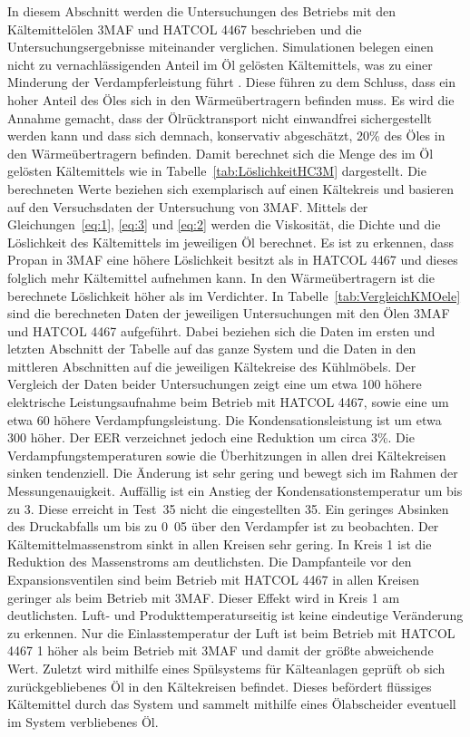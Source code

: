 In diesem Abschnitt werden die Untersuchungen des Betriebs mit den Kältemittelölen 3MAF und HATCOL 4467 beschrieben und die Untersuchungsergebnisse miteinander verglichen.
Simulationen belegen einen nicht zu vernachlässigenden Anteil im Öl gelösten Kältemittels, was zu einer Minderung der Verdampferleistung führt \cite{Universitatpolitecnicadevalencia.2017}. Diese führen zu dem Schluss, dass ein hoher Anteil des Öles sich in den Wärmeübertragern befinden muss. Es wird die Annahme gemacht, dass der Ölrücktransport nicht einwandfrei sichergestellt werden kann und dass sich demnach, konservativ abgeschätzt, \unit{20}{\%} des Öles in den Wärmeübertragern befinden. Damit berechnet sich die Menge des im Öl gelösten Kältemittels wie in Tabelle~\ref{tab:LöslichkeitHC3M} dargestellt.
Die berechneten Werte beziehen sich exemplarisch auf einen Kältekreis und basieren auf den Versuchsdaten der Untersuchung von 3MAF.
Mittels der Gleichungen~\ref{eq:1}, \ref{eq:3} und \ref{eq:2} werden die Viskosität, die Dichte und die Löslichkeit des Kältemittels im jeweiligen Öl berechnet. Es ist zu erkennen, dass Propan in 3MAF eine höhere Löslichkeit besitzt als in HATCOL 4467 und dieses folglich mehr Kältemittel aufnehmen kann. In den Wärmeübertragern ist die berechnete Löslichkeit höher als im Verdichter. \newline
In Tabelle~\ref{tab:VergleichKMOele} sind die berechneten Daten der jeweiligen Untersuchungen mit den Ölen 3MAF und HATCOL 4467 aufgeführt. Dabei beziehen sich die Daten im ersten und letzten Abschnitt der Tabelle auf das ganze System und die Daten in den mittleren Abschnitten auf die jeweiligen Kältekreise des Kühlmöbels.
Der Vergleich der Daten beider Untersuchungen zeigt eine um etwa \unit{100}{\watt} höhere elektrische Leistungsaufnahme beim Betrieb mit HATCOL 4467, sowie eine um etwa \unit{60}{\watt} höhere Verdampfungsleistung. Die Kondensationsleistung ist um etwa \unit{300}{\watt} höher. Der EER verzeichnet jedoch eine Reduktion um circa \unit{3}{\%}. Die Verdampfungstemperaturen sowie die Überhitzungen in allen drei Kältekreisen sinken tendenziell. Die Änderung ist sehr gering und bewegt sich im Rahmen der Messungenauigkeit. \newline
Auffällig ist ein Anstieg der Kondensationstemperatur um bis zu \unit{3}{\kelvin}. Diese erreicht in Test~35 nicht die eingestellten \unit{35}{\celsius}. Ein geringes Absinken des Druckabfalls um bis zu \unit{0.05}{\bbar} über den Verdampfer ist zu beobachten. Der Kältemittelmassenstrom sinkt in allen Kreisen sehr gering. In Kreis 1 ist die Reduktion des Massenstroms am deutlichsten. Die Dampfanteile vor den Expansionsventilen sind beim Betrieb mit HATCOL 4467 in allen Kreisen geringer als beim Betrieb mit 3MAF. Dieser Effekt wird in Kreis 1 am deutlichsten. 
Luft- und Produkttemperaturseitig ist keine eindeutige Veränderung zu erkennen. 
Nur die Einlasstemperatur der Luft ist beim Betrieb mit HATCOL 4467 \unit{1}{\kelvin} höher als beim Betrieb mit 3MAF und damit der größte abweichende Wert. 
Zuletzt wird mithilfe eines Spülsystems für Kälteanlagen geprüft ob sich zurückgebliebenes Öl in den Kältekreisen befindet. Dieses befördert flüssiges Kältemittel durch das System und sammelt mithilfe eines Ölabscheider eventuell im System verbliebenes Öl.


